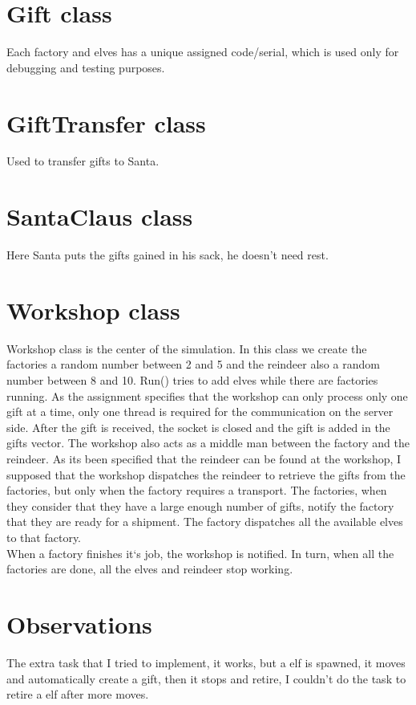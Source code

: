 \documentclass{article}
\begin{document}
\section{Gift class}

Each factory and elves has a unique assigned code/serial, which is used only for debugging and testing purposes. 

\section{GiftTransfer class}

Used to transfer gifts to Santa.

\section{SantaClaus class}

 Here Santa puts the gifts gained in his sack, he doesn't need rest.
 \newpage
 
\section{Workshop class}

Workshop class is the center of the simulation.
In this class we create the factories a random number between 2 and 5 and the reindeer also a random number between 8 and 10.
Run() tries to add elves while there are factories running.
As the assignment specifies that the workshop can only process only one gift at a time, only one thread is required for the  communication on the server side. After the gift
is received, the socket is closed and the gift is added in the gifts vector.
The workshop also acts as a middle man between the factory and the reindeer. As its been specified that the reindeer can be found at the workshop, I supposed that the workshop dispatches the reindeer to retrieve the gifts from the factories, but only when the factory requires a transport. The factories, when they consider that they have a large enough number of gifts, notify the factory that they are ready for a shipment. The
factory dispatches all the available elves to that factory.\\
When a factory finishes it‘s job, the workshop is notified. In turn, when
all the factories are done, all the elves and reindeer stop working.

\section{Observations}
The extra task that I tried to implement, it works, but a elf is spawned, it moves and automatically create a gift, then it stops and retire, I couldn't do the task to retire a elf after more moves.
\end{document}
